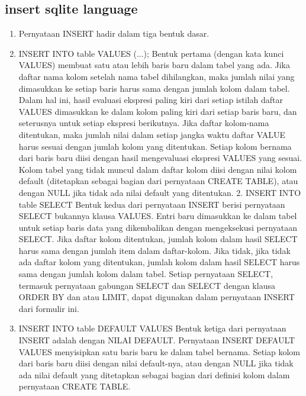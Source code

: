 \begin{enumerate}
			\subsection{insert sqlite language}
\begin{enumerate}
\itemSisipan Bahasa Query Sqlite
\item Pernyataan INSERT hadir dalam tiga bentuk dasar.
\item INSERT INTO table VALUES (...);
Bentuk pertama (dengan kata kunci VALUES) membuat satu atau lebih baris baru dalam tabel yang ada. Jika daftar nama kolom setelah nama tabel dihilangkan, maka jumlah nilai yang dimasukkan ke setiap baris harus sama dengan jumlah kolom dalam tabel. Dalam hal ini, hasil evaluasi ekspresi paling kiri dari setiap istilah daftar VALUES dimasukkan ke dalam kolom paling kiri dari setiap baris baru, dan seterusnya untuk setiap ekspresi berikutnya. Jika daftar kolom-nama ditentukan, maka jumlah nilai dalam setiap jangka waktu daftar VALUE harus sesuai dengan jumlah kolom yang ditentukan. Setiap kolom bernama dari baris baru diisi dengan hasil mengevaluasi ekspresi VALUES yang sesuai. Kolom tabel yang tidak muncul dalam daftar kolom diisi dengan nilai kolom default (ditetapkan sebagai bagian dari pernyataan CREATE TABLE), atau dengan NULL jika tidak ada nilai default yang ditentukan.
2. INSERT INTO table SELECT 
Bentuk kedua dari pernyataan INSERT berisi pernyataan SELECT bukannya klausa VALUES. Entri baru dimasukkan ke dalam tabel untuk setiap baris data yang dikembalikan dengan mengeksekusi pernyataan SELECT. Jika daftar kolom ditentukan, jumlah kolom dalam hasil SELECT harus sama dengan jumlah item dalam daftar-kolom. Jika tidak, jika tidak ada daftar kolom yang ditentukan, jumlah kolom dalam hasil SELECT harus sama dengan jumlah kolom dalam tabel. Setiap pernyataan SELECT, termasuk pernyataan gabungan SELECT dan SELECT dengan klausa ORDER BY dan atau LIMIT, dapat digunakan dalam pernyataan INSERT dari formulir ini.
\item INSERT INTO table DEFAULT VALUES
Bentuk ketiga dari pernyataan INSERT adalah dengan NILAI DEFAULT. Pernyataan INSERT DEFAULT VALUES menyisipkan satu baris baru ke dalam tabel bernama. Setiap kolom dari baris baru diisi dengan nilai default-nya, atau dengan NULL jika tidak ada nilai default yang ditetapkan sebagai bagian dari definisi kolom dalam pernyataan CREATE TABLE.
\end{enumerate}

\end{enumerate}
